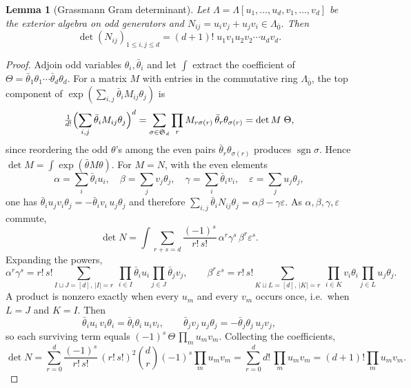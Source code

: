 \documentclass[11pt]{article}
\newtheorem{lemma}[theorem]{Lemma}
\theoremstyle{definition}
\newcommand{\Sg}{\mathfrak S}
\DeclareMathOperator{\sgn}{sgn}
\begin{document}
\begin{lemma}[Grassmann Gram determinant]\label{lem:grass}
Let $\Lambda=\Lambda[u_1,\dots,u_d,v_1,\dots,v_d]$ be the exterior algebra on odd generators and $N_{ij}=u_iv_j+u_jv_i\in\Lambda_{\bar0}$. Then
\[
\det(N_{ij})_{1\le i,j\le d}=(d+1)!\;u_1v_1u_2v_2\cdots u_dv_d .
\]
\end{lemma}
\begin{proof}
Adjoin odd variables $\theta_i,\bar\theta_i$ and let $\int$ extract the coefficient of $\Theta=\bar\theta_1\theta_1\cdots\bar\theta_d\theta_d$. For a matrix $M$ with entries in the commutative ring $\Lambda_{\bar0}$, the top component of $\exp(\sum_{i,j}\bar\theta_iM_{ij}\theta_j)$ is
\[
\tfrac1{d!}\Bigl(\sum_{i,j}\bar\theta_iM_{ij}\theta_j\Bigr)^d=\sum_{\sigma\in\Sg_d}\prod_{r}M_{r\sigma(r)}\,\bar\theta_r\theta_{\sigma(r)}=\det M\;\Theta ,
\]
since reordering the odd $\theta$'s among the even pairs $\bar\theta_r\theta_{\sigma(r)}$ produces $\sgn\sigma$. Hence $\det M=\int\exp(\bar\theta M\theta)$. For $M=N$, with the even elements
\[
\alpha=\sum_i\bar\theta_iu_i,\quad \beta=\sum_jv_j\theta_j,\quad \gamma=\sum_i\bar\theta_iv_i,\quad \varepsilon=\sum_ju_j\theta_j,
\]
one has $\bar\theta_iu_jv_i\theta_j=-\bar\theta_iv_i\,u_j\theta_j$ and therefore $\sum_{i,j}\bar\theta_iN_{ij}\theta_j=\alpha\beta-\gamma\varepsilon$. As $\alpha,\beta,\gamma,\varepsilon$ commute,
\[
\det N=\int\sum_{r+s=d}\frac{(-1)^s}{r!\,s!}\,\alpha^r\gamma^s\,\beta^r\varepsilon^s .
\]
Expanding the powers,
\[
\alpha^r\gamma^s=r!\,s!\sum_{I\sqcup J=[d],\,|I|=r}\ \prod_{i\in I}\bar\theta_iu_i\prod_{j\in J}\bar\theta_jv_j,\qquad
\beta^r\varepsilon^s=r!\,s!\sum_{K\sqcup L=[d],\,|K|=r}\ \prod_{i\in K}v_i\theta_i\prod_{j\in L}u_j\theta_j .
\]
A product is nonzero exactly when every $u_m$ and every $v_m$ occurs once, i.e.\ when $L=J$ and $K=I$. Then
\[
\bar\theta_iu_i\,v_i\theta_i=\bar\theta_i\theta_i\,u_iv_i,\qquad \bar\theta_jv_j\,u_j\theta_j=-\bar\theta_j\theta_j\,u_jv_j,
\]
so each surviving term equals $(-1)^s\,\Theta\,\prod_mu_mv_m$. Collecting the coefficients,
\[
\det N=\sum_{r=0}^d\frac{(-1)^s}{r!\,s!}\,(r!\,s!)^2\binom dr(-1)^s\prod_mu_mv_m=\sum_{r=0}^dd!\,\prod_mu_mv_m=(d+1)!\prod_mu_mv_m .
\]
\end{proof}
\end{document}
